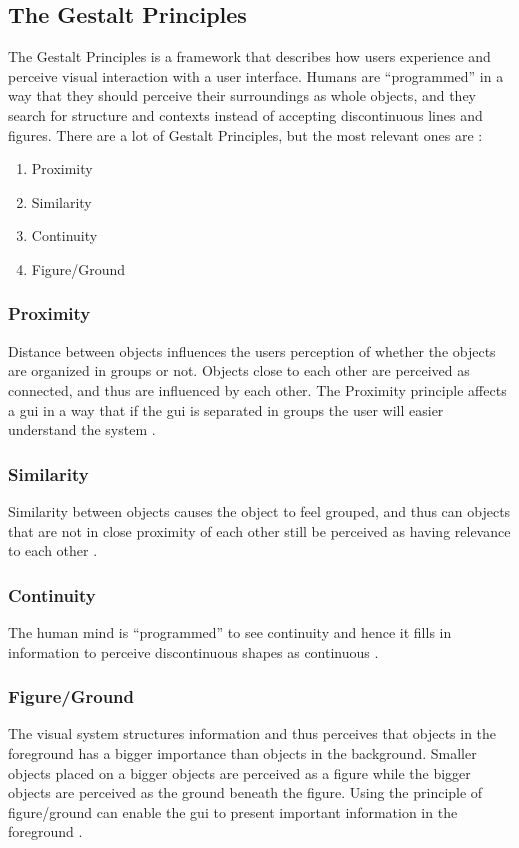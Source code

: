 \subsection{The Gestalt Principles}
\label{sec:gestaltprinciples}
The Gestalt Principles is a framework that describes how users experience and perceive visual interaction with a user interface. Humans are ``programmed'' in a way that they should perceive their surroundings as whole objects, and they search for structure and contexts instead of accepting discontinuous lines and figures. There are a lot of Gestalt Principles, but the most relevant ones are \cite{johnson}:
\begin{enumerate}
     \item Proximity
     \item Similarity
     \item Continuity
     \item Figure/Ground
 \end{enumerate}

\subsubsection{Proximity}
\label{sec:proximity}
Distance between objects influences the users perception of whether the objects are organized in groups or not. Objects close to each other are perceived as connected, and thus are influenced by each other. The Proximity principle affects a \acrfull{gui} in a way that if the \acrshort{gui} is separated in groups the user will easier understand the system \cite{johnson}.

\subsubsection{Similarity}
\label{sec:similarity}
Similarity between objects causes the object to feel grouped, and thus can objects that are not in close proximity of each other still be perceived as having relevance to each other \cite{johnson}.

\subsubsection{Continuity}
\label{sec:continuity}
The human mind is ``programmed'' to see continuity and hence it fills in information to perceive discontinuous shapes as continuous \cite{johnson}.

\subsubsection{Figure/Ground}
\label{sec:figureground}
The visual system structures information and thus perceives that objects in the foreground has a bigger importance than objects in the background. Smaller objects placed on a bigger objects are perceived as a figure while the bigger objects are perceived as the ground beneath the figure. Using the principle of figure/ground can enable the \acrshort{gui} to present important information in the foreground \cite{johnson}.